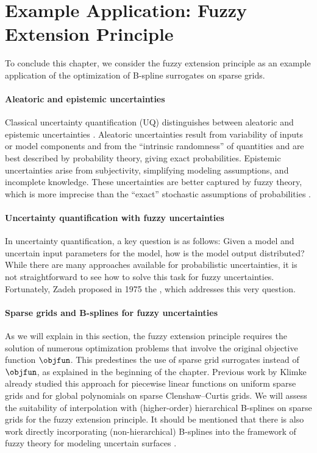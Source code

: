 \section{Example Application: Fuzzy Extension Principle}
\label{sec:55fuzzy}

To conclude this chapter, we consider the fuzzy extension principle
as an example application of the optimization of B-spline surrogates
on sparse grids.

\paragraph{Aleatoric and epistemic uncertainties}

Classical uncertainty quantification (UQ) distinguishes between
aleatoric and epistemic uncertainties \cite{Walz16Fuzzy}.
Aleatoric uncertainties result from variability of inputs or
model components and from the ``intrinsic randomness''
of quantities and are best described by probability theory,
giving exact probabilities.
Epistemic uncertainties arise from subjectivity,
simplifying modeling assumptions, and incomplete knowledge.
These uncertainties are better captured by fuzzy theory,
which is more imprecise than the ``exact'' stochastic assumptions
of probabilities \cite{Walz16Fuzzy}.

\paragraph{Uncertainty quantification with fuzzy uncertainties}

In uncertainty quantification, a key question is as follows:
Given a model and uncertain input parameters for the model,
how is the model output distributed?
While there are many approaches available
for probabilistic uncertainties,
it is not straightforward to see how to solve this task
for fuzzy uncertainties.
Fortunately, Zadeh proposed in 1975
the  \cite{Zadeh75Concept},
which addresses this very question.

\paragraph{Sparse grids and B-splines for fuzzy uncertainties}

As we will explain in this section,
the fuzzy extension principle requires the solution of numerous
optimization problems that involve the original objective function
$\objfun$.
This predestines the use of sparse grid surrogates instead of
$\objfun$, as explained in the beginning of the chapter.
Previous work by Klimke \cite{Klimke06Uncertainty} already
studied this approach for piecewise linear functions on uniform sparse grids
and for global polynomials on sparse Clenshaw--Curtis grids.
We will assess the suitability of interpolation with (higher-order)
hierarchical B-splines on sparse grids for the fuzzy extension principle.
It should be mentioned that there is also work
directly incorporating (non-hierarchical) B-splines
into the framework of fuzzy theory for modeling uncertain surfaces
.



